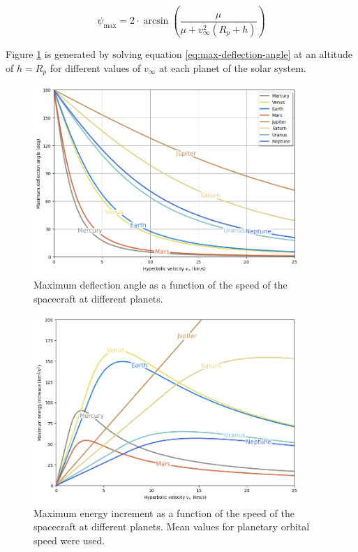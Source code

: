 \begin{equation}
  \psi_{\max} = 2 \cdot \arcsin{\left(\frac{\mu}{\mu + {v}^{2}_{\infty}(R_p + h)}\right)}
  \label{eq:max-deflection-angle}
\end{equation}

Figure \ref{fig:deflection-angle-at-speed} is generated by solving equation
\ref{eq:max-deflection-angle} at an altitude of $h = R_p$ for different values
of $v_{\infty}$ at each planet of the solar system.

\begin{figure}[H]
  \centering
  \includegraphics[width=0.9\textwidth]{fig/static/deflection_angle.png}
  \caption[Maximum deflection angle as a function of the speed of the spacecraft at different planets.]{Maximum deflection angle as a function of the speed of the spacecraft at different planets.}
  \label{fig:deflection-angle-at-speed}
\end{figure}

\begin{figure}[H]
  \centering
  \includegraphics[width=0.9\textwidth]{fig/static/max_energy.png}
  \caption[Maximum energy increment as a function of the speed of the
    spacecraft at different planets.]{Maximum energy increment as a function
    of the speed of the spacecraft at different planets. Mean values for
    planetary orbital speed were used.}
  \label{fig:max-energy-at-speed}
\end{figure}

